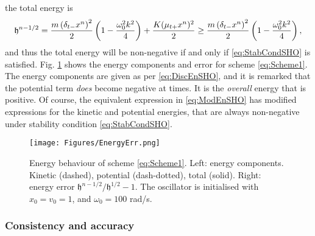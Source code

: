 the total energy is 
\begin{equation}\label{eq:ModEnSHO}
    \mathfrak{h}^{n-1/2} = \frac{m\left(\delta_{t-} x^n \right)^2}{2} \left(1 - \frac{\omega_0^2 k^2}{4}\right) + \frac{K (\mu_{t+} x^n)^2}{2} \geq \frac{m\left(\delta_{t-} x^n \right)^2}{2} \left(1 - \frac{\omega_0^2 k^2}{4}\right),
\end{equation}
and thus the total energy will be non-negative if and only if \eqref{eq:StabCondSHO} is satisfied. Fig. \ref{fig:EnConsSHO} shows the energy components and error for scheme \eqref{eq:Scheme1}. The energy components are given as per \eqref{eq:DiscEnSHO}, and it is remarked that the potential term \emph{does} become negative at times. It is the \emph{overall} energy that is positive. Of course, the equivalent expression in \eqref{eq:ModEnSHO} has modified expressions for the kinetic and potential energies, that are always non-negative under stability condition \eqref{eq:StabCondSHO}.
\begin{figure}
    \texttt{[image: Figures/EnergyErr.png]}
    \caption{Energy behaviour of scheme \eqref{eq:Scheme1}. Left: energy components. Kinetic (dashed), potential (dash-dotted), total (solid). Right: energy error $\mathfrak{h}^{n-1/2}/\mathfrak{h}^{1/2}-1$. The oscillator is initialised with $x_0=v_0=1$, and $\omega_0=100$ rad/s.}\label{fig:EnConsSHO}
\end{figure}




\subsubsection{Consistency and accuracy}

